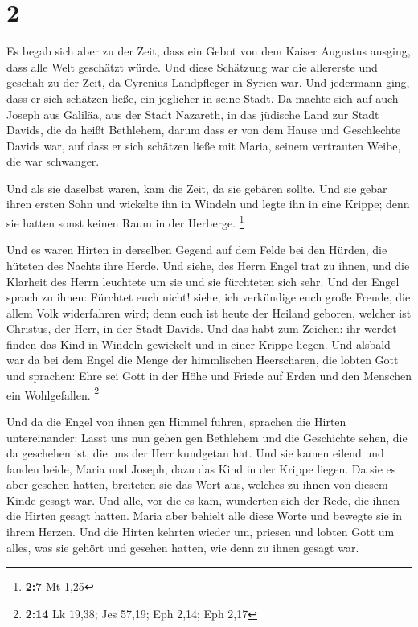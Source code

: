 \hypertarget{section-1}{%
\section{2}\label{section-1}}

 Es begab sich aber zu der Zeit, dass ein Gebot von dem
Kaiser Augustus ausging, dass alle Welt geschätzt würde. 
Und diese Schätzung war die allererste und geschah zu der Zeit, da
Cyrenius Landpfleger in Syrien war.  Und jedermann ging,
dass er sich schätzen ließe, ein jeglicher in seine Stadt.
 Da machte sich auf auch Joseph aus Galiläa, aus der Stadt
Nazareth, in das jüdische Land zur Stadt Davids, die da heißt Bethlehem,
darum dass er von dem Hause und Geschlechte Davids war, 
auf dass er sich schätzen ließe mit Maria, seinem vertrauten Weibe, die
war schwanger.

 Und als sie daselbst waren, kam die Zeit, da sie gebären
sollte.  Und sie gebar ihren ersten Sohn und wickelte ihn
in Windeln und legte ihn in eine Krippe; denn sie hatten sonst keinen
Raum in der Herberge. \footnote{\textbf{2:7} Mt 1,25}

 Und es waren Hirten in derselben Gegend auf dem Felde bei
den Hürden, die hüteten des Nachts ihre Herde.  Und siehe,
des Herrn Engel trat zu ihnen, und die Klarheit des Herrn leuchtete um
sie und sie fürchteten sich sehr.  Und der Engel sprach
zu ihnen: Fürchtet euch nicht! siehe, ich verkündige euch große Freude,
die allem Volk widerfahren wird;  denn euch ist heute der
Heiland geboren, welcher ist Christus, der Herr, in der Stadt Davids.
 Und das habt zum Zeichen: ihr werdet finden das Kind in
Windeln gewickelt und in einer Krippe liegen.  Und
alsbald war da bei dem Engel die Menge der himmlischen Heerscharen, die
lobten Gott und sprachen:  Ehre sei Gott in der Höhe und
Friede auf Erden und den Menschen ein Wohlgefallen. \footnote{\textbf{2:14}
  Lk 19,38; Jes 57,19; Eph 2,14; Eph 2,17}

 Und da die Engel von ihnen gen Himmel fuhren, sprachen
die Hirten untereinander: Lasst uns nun gehen gen Bethlehem und die
Geschichte sehen, die da geschehen ist, die uns der Herr kundgetan hat.
 Und sie kamen eilend und fanden beide, Maria und Joseph,
dazu das Kind in der Krippe liegen.  Da sie es aber
gesehen hatten, breiteten sie das Wort aus, welches zu ihnen von diesem
Kinde gesagt war.  Und alle, vor die es kam, wunderten
sich der Rede, die ihnen die Hirten gesagt hatten.  Maria
aber behielt alle diese Worte und bewegte sie in ihrem Herzen.
 Und die Hirten kehrten wieder um, priesen und lobten
Gott um alles, was sie gehört und gesehen hatten, wie denn zu ihnen
gesagt war.

